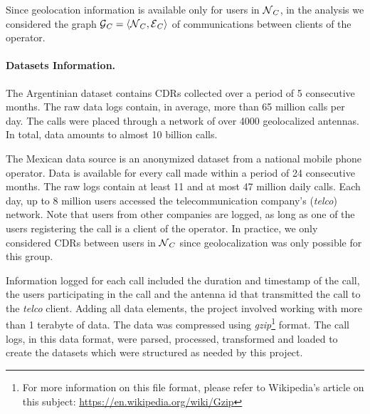 Since geolocation information is available only for users in $\operatorname{\mathcal{N}}_C$, in the analysis we considered the graph $\operatorname{\mathcal{G}}_C = \left< \operatorname{\mathcal{N}}_C, \operatorname{\mathcal{E}}_C \right>$ of communications between clients of the operator.

\paragraph{Datasets Information.}

The Argentinian dataset contains CDRs collected over a period of 5 consecutive months.
The raw data logs contain, in average, more than 65 million calls per day.
The calls were placed through a network of over 4000 geolocalized antennas.
In total, data amounts to almost 10 billion calls.

The Mexican data source is an anonymized dataset from a national mobile phone operator.
Data is available for every call made within a period of 24 consecutive months.
The raw logs contain at least 11 and at most 47 million daily calls.
Each day, up to 8 million users accessed the telecommunication company's (\textit{telco}) network.
Note that users from other companies are logged, as long as one of the users registering the call is a client of the operator.
In practice, we only considered CDRs between users in $\operatorname{\mathcal{N}}_C$ since geolocalization was only possible for this group.

Information logged for each call included the duration and timestamp of the call, the users participating in the call and the antenna id that transmitted the call to the \emph{telco} client.
Adding all data elements, the project involved working with more than 1 terabyte of data.
The data was compressed using \emph{gzip}\footnote{For more information on this file format, please refer to Wikipedia's article on this subject: \url{https://en.wikipedia.org/wiki/Gzip}} format.
The call logs, in this data format, were parsed, processed, transformed and loaded to create the datasets which were structured as needed by this project.


